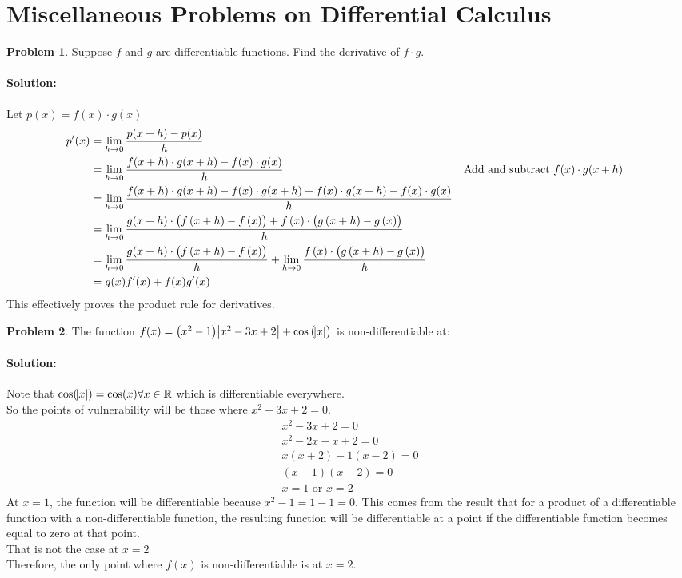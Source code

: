 \documentclass[14]{article}
\theoremstyle{definition}
\newtheorem{prob}{Problem}
\theoremstyle{case}
\begin{document}
\section{Miscellaneous Problems on Differential Calculus}
\begin{prob}
Suppose $f$ and $g$ are differentiable functions. Find the derivative of $f \cdot g$.
\paragraph{Solution:} Let $p(x) = f(x) \cdot g(x)$
\begin{align*}
p'(x) &= \lim\limits_{h \to 0} \dfrac{p(x + h) - p(x)}{h}\\
&= \lim\limits_{h \to 0} \dfrac{f(x + h)\cdot g(x+h) - f(x)\cdot g(x)}{h} && \parbox[t]{5cm}{Add and subtract $f(x)\cdot g(x+h)$}\\
&= \lim\limits_{h \to 0} \dfrac{f(x + h)\cdot g(x+h) - f(x)\cdot g(x+h) + f(x)\cdot g(x+h) - f(x)\cdot g(x)}{h}\\
&= \lim\limits_{h \to 0} \dfrac{g(x+h)\cdot\left(f\left(x + h\right) - f\left(x\right)\right) + f\left(x\right)\cdot \left(g\left(x+h\right) - g\left(x\right)\right)}{h}\\
&= \lim\limits_{h \to 0} \dfrac{g(x+h)\cdot\left(f\left(x + h\right) - f\left(x\right)\right)}{h} + \lim\limits_{h \to 0} \dfrac{f\left(x\right)\cdot \left(g\left(x+h\right) - g\left(x\right)\right)}{h}\\
&= g(x) f'(x) + f(x) g'(x)
\end{align*}
This effectively proves the product rule for derivatives.\\
\end{prob}
\begin{prob}
The function
$f(x) = \left(x^2 - 1\right) \abs{x^2 -3x + 2} + \cos\left(\abs{x}\right)$ is non-differentiable at:\\
\paragraph{Solution:}
Note that $\cos(\abs{x}) = \cos(x) \forall x \in \mathbb{R}$ which is differentiable everywhere.\\
So the points of vulnerability will be those where $x^2 - 3x + 2 = 0$.
\begin{align*}
x^2 - 3x + 2 = 0\\
x^2 - 2x - x + 2 = 0\\
x(x + 2) - 1(x-2) = 0\\
(x-1)(x-2) = 0\\
x = 1 \text{ or } x = 2
\end{align*}
At $x = 1$, the function will be differentiable because $x^2 -1 = 1 - 1 = 0$. This comes from the result that for a product of a differentiable function with a non-differentiable function, the resulting function will be differentiable at a point if the differentiable function becomes equal to zero at that point.\\
That is not the case at $x = 2$\\
Therefore, the only point where $f(x)$ is non-differentiable is at $x = 2$.
\end{prob}
\end{document}
